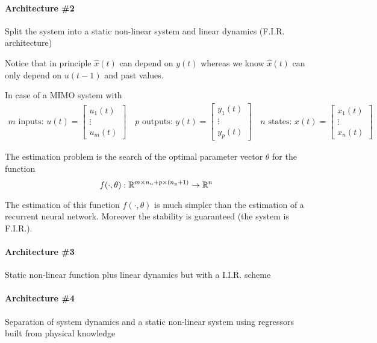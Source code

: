 \paragraph{Architecture \#2} Split the system into a static non-linear system and linear dynamics (F.I.R. architecture)


\begin{remark}
    Notice that in principle $\hat{x}(t)$ can depend on $y(t)$ whereas we know $\hat{x}(t)$ can only depend on $u(t-1)$ and past values.

    In case of a MIMO system with
    \begin{align*}
        m \text{ inputs: } u(t) = \begin{bmatrix}
            u_1(t) \\
            \vdots \\
            u_m(t)
        \end{bmatrix} \quad p \text{ outputs: } y(t) = \begin{bmatrix}
            y_1(t) \\
            \vdots \\
            y_p(t)
        \end{bmatrix} \quad n \text{ states: } x(t) = \begin{bmatrix}
            x_1(t) \\
            \vdots \\
            x_n(t)
        \end{bmatrix}
    \end{align*}

    The estimation problem is the search of the optimal parameter vector $\theta$ for the function
    \[
        f(\cdot, \theta): \mathbb{R}^{m\times n_u + p \times (n_y + 1)} \rightarrow \mathbb{R}^n
    \]

    The estimation of this function $f(\cdot, \theta)$ is much simpler than the estimation of a recurrent neural network.
    Moreover the stability is guaranteed (the system is F.I.R.).
\end{remark}

\paragraph{Architecture \#3} Static non-linear function plus linear dynamics but with a I.I.R. scheme


\paragraph{Architecture \#4} Separation of system dynamics and a static non-linear system using regressors built from physical knowledge

